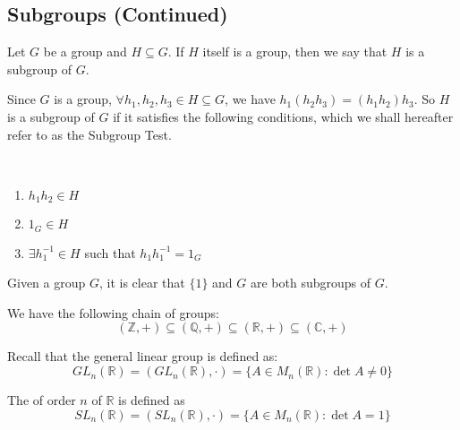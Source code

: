 \documentclass[notoc,notitlepage]{tufte-book}
\begin{document}
\subsection{Subgroups (Continued)}
\label{sub:subgroups_continued}

\begin{note}
  Let $G$ be a group and $H \subseteq G$. If $H$ itself is a group, then we say that $H$ is a subgroup of $G$.
\end{note}

\begin{note}
  Since $G$ is a group, $\forall h_1, h_2, h_3 \in H \subseteq G$, we have $h_1 (h_2 h_3) = (h_1 h_2) h_3$. So $H$ is a subgroup of $G$ if it satisfies the following conditions, which we shall hereafter refer to as the Subgroup Test.

\noindent{} \\
  \begin{enumerate}
    \item $h_1 h_2 \in H$
    \item $1_G \in H$
    \item $\exists h_1^{-1} \in H$ such that $h_1 h_1^{-1} = 1_G$
  \end{enumerate}
\end{note}

\begin{eg}
  Given a group $G$, it is clear that $\{1\}$ and $G$ are both subgroups of $G$.
\end{eg}

\begin{eg}
  We have the following chain of groups:
  \begin{equation*}
    (\mathbb{Z}, +) \subseteq (\mathbb{Q}, +) \subseteq (\mathbb{R}, +) \subseteq (\mathbb{C}, +)
  \end{equation*}
\end{eg}

Recall that the general linear group is defined as:
\begin{equation*}
  GL_n(\mathbb{R}) = (GL_n(\mathbb{R}), \cdot) = \{A \in M_n(\mathbb{R}) : \det A \neq 0 \}
\end{equation*}

\begin{defn}\label{defn:special_linear_group}
  The  of order $n$ of $\mathbb{R}$ is defined as
  \begin{equation*}
    SL_n(\mathbb{R}) = (SL_n(\mathbb{R}), \cdot) = \{A \in M_n(\mathbb{R}) : \det A = 1 \}
  \end{equation*}
\end{defn}
\end{document}
